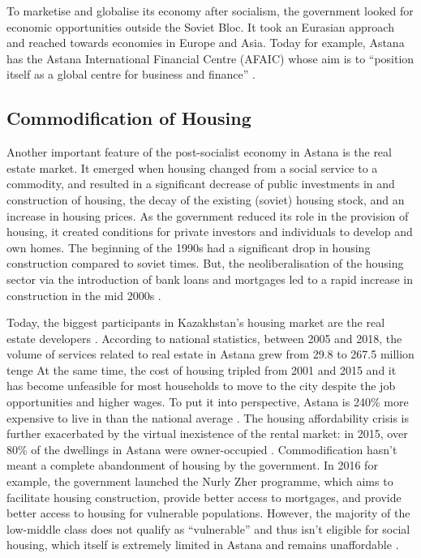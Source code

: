 \documentclass{article}
\begin{document}
To marketise and globalise its economy after socialism, the government looked for economic opportunities outside the Soviet Bloc. It took an Eurasian approach and reached towards economies in Europe and Asia. Today for example, Astana has the Astana International Financial Centre (AFAIC) whose aim is to ``position itself as a global centre for business and finance'' \parencite{aifc}. 

\subsection{Commodification of Housing}

Another important feature of the post-socialist economy in Astana is the real estate market. It emerged when housing changed from a social service to a commodity, and resulted in a significant decrease of public investments in and construction of housing, the decay of the existing (soviet) housing stock, and an increase in housing prices. 
As the government reduced its role in the provision of housing, it created conditions for private investors and individuals to develop and own homes. The beginning of the 1990s had a significant drop in housing construction compared to soviet times. But, the neoliberalisation of the housing sector via the introduction of bank loans and mortgages led to a rapid increase in construction in the mid 2000s \parencite{unece2018housing}.

Today, the biggest participants in Kazakhstan's housing market are the real estate developers \parencite{unece2018housing}. According to national statistics, between 2005 and 2018, the volume of services related to real estate in Astana grew from 29.8 to 267.5 million tenge %
At the same time, the cost of housing tripled from 2001 and 2015 \parencite{seitz2021urbanization} and it has become unfeasible for most households to move to the city despite the job opportunities and higher wages. To put it into perspective, Astana is 240\% more expensive to live in than the national average \parencite{seitz2021urbanization}. The housing affordability crisis is further exacerbated by the virtual inexistence of the rental market: in 2015, over 80\% of the dwellings in Astana were owner-occupied \parencite{seitz2021urbanization}.
Commodification hasn't meant a complete abandonment of housing by the government. In 2016 for example, the government launched the Nurly Zher programme, which aims to facilitate housing construction, provide better access to mortgages, and provide better access to housing for vulnerable populations. However, the majority of the low-middle class does not qualify as ``vulnerable'' and thus isn't eligible for social housing, which itself is extremely limited in Astana and remains unaffordable \parencite{unece2018housing}.
\end{document}
